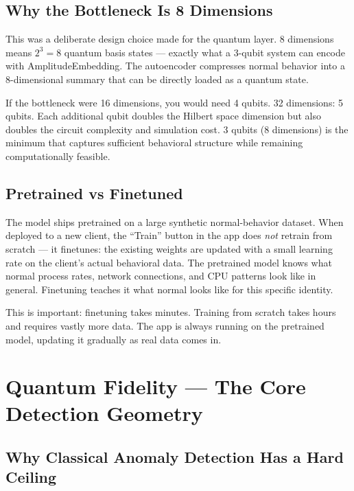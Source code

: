 \documentclass[11pt,a4paper]{article}
\begin{document}
\subsection{Why the Bottleneck Is 8 Dimensions}

This was a deliberate design choice made for the quantum layer. 8 dimensions means $2^3 = 8$ quantum basis states — exactly what a 3-qubit system can encode with AmplitudeEmbedding. The autoencoder compresses normal behavior into a 8-dimensional summary that can be directly loaded as a quantum state.

If the bottleneck were 16 dimensions, you would need 4 qubits. 32 dimensions: 5 qubits. Each additional qubit doubles the Hilbert space dimension but also doubles the circuit complexity and simulation cost. 3 qubits (8 dimensions) is the minimum that captures sufficient behavioral structure while remaining computationally feasible.

\subsection{Pretrained vs Finetuned}

The model ships pretrained on a large synthetic normal-behavior dataset. When deployed to a new client, the ``Train'' button in the app does \textit{not} retrain from scratch — it finetunes: the existing weights are updated with a small learning rate on the client's actual behavioral data. The pretrained model knows what normal process rates, network connections, and CPU patterns look like in general. Finetuning teaches it what normal looks like for this specific identity.

This is important: finetuning takes minutes. Training from scratch takes hours and requires vastly more data. The app is always running on the pretrained model, updating it gradually as real data comes in.

\section{Quantum Fidelity — The Core Detection Geometry}

\subsection{Why Classical Anomaly Detection Has a Hard Ceiling}
\end{document}
